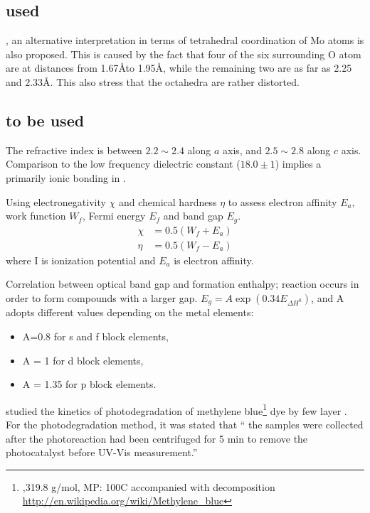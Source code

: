 \subsection{used}



, an alternative interpretation in terms of tetrahedral coordination of Mo atoms is also proposed. This is caused by the fact that four of the six surrounding O atom are at distances from 1.67\AA to 1.95\AA, while the remaining two are as far as 2.25 and 2.33\AA. This also stress that the  octahedra are rather distorted.


\subsection{to be used}

The refractive index is between $ 2.2\sim 2.4$ along $a$ axis, and $ 2.5\sim 2.8$ along $c$ axis. Comparison to the low frequency dielectric constant ($18.0\pm1$) implies a primarily ionic bonding in .\cite{He2003}


\cite{Matar2011} Using electronegativity $\chi$ and chemical hardness $\eta$ to assess electron affinity $E_a$, work function $W_f$, Fermi energy $E_f$ and band gap $E_g$.
\begin{align}
\chi &= 0.5(W_f + E_a)\\
\eta & = 0.5(W_f - E_a)
\end{align}
where I is ionization potential and $E_a$ is electron affinity.

Correlation between optical band gap and formation enthalpy; reaction occurs in order to form compounds with a larger gap.  $E_g = A \exp(0.34E_{\Delta H^0})$, and A adopts different values depending on the metal elements:
\begin{itemize}
\item A=0.8 for s and f block elements,
\item A = 1 for d block elements,
\item A = 1.35 for p block elements.
\end{itemize}


\citeauthor{Sreedhara2013} studied the kinetics of photodegradation of methylene blue\footnote{,319.8 g/mol, MP: 100C accompanied with decomposition \url{http://en.wikipedia.org/wiki/Methylene_blue}} dye by few layer .
For the photodegradation method, it was stated that `` the samples were collected after the photoreaction had been centrifuged for 5 min to remove the photocatalyst before UV-Vis measurement.''


